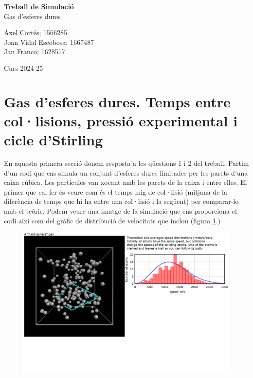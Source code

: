 \documentclass{article}
\begin{document}
	
	\begin{titlepage}
		\begin{center}
			\vspace*{1cm}
			
			\Huge
			\textbf{Treball de Simulació} \\
			Gas d'esferes dures
			
			\vspace{0.5cm}
			
			
			
			
			\vspace{1.5cm}
			\Large
			Àxel Cortés; 1566285 \\
			Joan Vidal Escobosa; 1667487 \\
			Jan Franco; 1628517 \\ 
			
			
			\vfill
			\LARGE
			
			\vspace{0.8cm}
			
			\Large
			Curs 2024-25 
		\end{center} 
	\end{titlepage}
	
	\setcounter{page}{1}
	
	
	\section{Gas d'esferes dures. Temps entre col·lisions, pressió experimental i cicle d'Stirling}
	
	
	En aquesta primera secció donem resposta a les qüestions 1 i 2 del treball. Partim d'un codi que ens simula un conjunt d'esferes dures limitades per les parets d'una caixa cúbica. Les partícules van xocant amb les parets de la caixa i entre elles. El primer que cal fer és veure com és el temps mig de col·lisió (mitjana de la diferència de temps que hi ha entre una col·lisió i la següent) per comparar-lo amb el teòric. Podem veure una imatge de la simulació que ens proporciona el codi així com del gràfic de distribució de velocitats que inclou (figura \ref{gugugu}.) \\
	
	
	\begin{figure}[h!]
		\centering
		\includegraphics[width=0.7\linewidth]{Interfaç.png}
		\label{gugugu}
	\end{figure}
	
\end{document}

